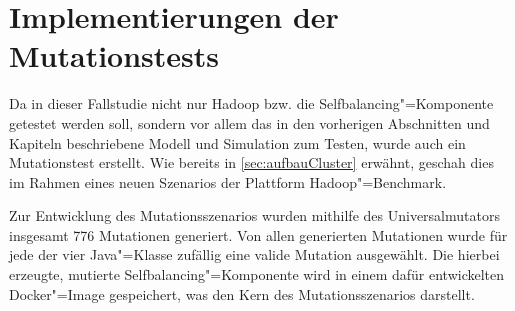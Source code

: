 \section{Implementierungen der Mutationstests}
\label{sec:implMutationTests}

Da in dieser Fallstudie nicht nur Hadoop bzw. die Selfbalancing"=Komponente getestet werden soll, sondern vor allem das in den vorherigen Abschnitten und Kapiteln beschriebene Modell und Simulation zum Testen, wurde auch ein Mutationstest erstellt.
Wie bereits in \autoref{sec:aufbauCluster} erwähnt, geschah dies im Rahmen eines neuen Szenarios der Plattform Hadoop"=Benchmark.

Zur Entwicklung des Mutationsszenarios wurden mithilfe des Universalmutators insgesamt 776 Mutationen generiert.
Von allen generierten Mutationen wurde für jede der vier Java"=Klasse zufällig eine valide Mutation ausgewählt.
Die hierbei erzeugte, mutierte Selfbalancing"=Komponente wird in einem dafür entwickelten Docker"=Image gespeichert, was den Kern des Mutationsszenarios darstellt.

